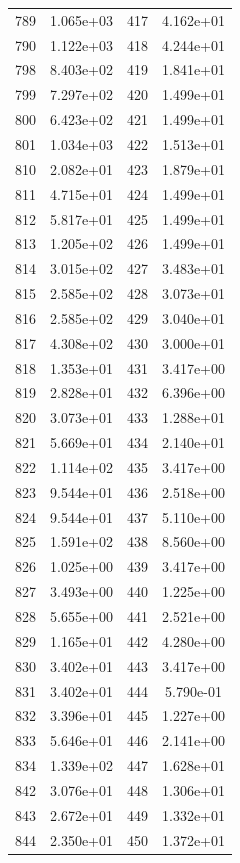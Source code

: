 \documentclass[12pt]{article}
\begin{document}
\begin{longtable}{@{}cccc@{}}
789 & 1.065e+03 & 417 & 4.162e+01 \\
790 & 1.122e+03 & 418 & 4.244e+01 \\
798 & 8.403e+02 & 419 & 1.841e+01 \\
799 & 7.297e+02 & 420 & 1.499e+01 \\
800 & 6.423e+02 & 421 & 1.499e+01 \\
801 & 1.034e+03 & 422 & 1.513e+01 \\
810 & 2.082e+01 & 423 & 1.879e+01 \\
811 & 4.715e+01 & 424 & 1.499e+01 \\
812 & 5.817e+01 & 425 & 1.499e+01 \\
813 & 1.205e+02 & 426 & 1.499e+01 \\
814 & 3.015e+02 & 427 & 3.483e+01 \\
815 & 2.585e+02 & 428 & 3.073e+01 \\
816 & 2.585e+02 & 429 & 3.040e+01 \\
817 & 4.308e+02 & 430 & 3.000e+01 \\
818 & 1.353e+01 & 431 & 3.417e+00 \\
819 & 2.828e+01 & 432 & 6.396e+00 \\
820 & 3.073e+01 & 433 & 1.288e+01 \\
821 & 5.669e+01 & 434 & 2.140e+01 \\
822 & 1.114e+02 & 435 & 3.417e+00 \\
823 & 9.544e+01 & 436 & 2.518e+00 \\
824 & 9.544e+01 & 437 & 5.110e+00 \\
825 & 1.591e+02 & 438 & 8.560e+00 \\
826 & 1.025e+00 & 439 & 3.417e+00 \\
827 & 3.493e+00 & 440 & 1.225e+00 \\
828 & 5.655e+00 & 441 & 2.521e+00 \\
829 & 1.165e+01 & 442 & 4.280e+00 \\
830 & 3.402e+01 & 443 & 3.417e+00 \\
831 & 3.402e+01 & 444 & 5.790e-01 \\
832 & 3.396e+01 & 445 & 1.227e+00 \\
833 & 5.646e+01 & 446 & 2.141e+00 \\
834 & 1.339e+02 & 447 & 1.628e+01 \\
842 & 3.076e+01 & 448 & 1.306e+01 \\
843 & 2.672e+01 & 449 & 1.332e+01 \\
844 & 2.350e+01 & 450 & 1.372e+01 \\

\end{longtable}
\end{document}
